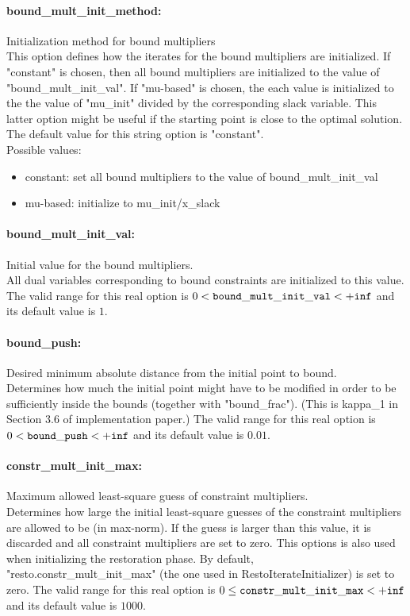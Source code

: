 \paragraph{bound\_mult\_init\_method:}\label{sec:bound_mult_init_method} Initialization method for bound multipliers $\;$ \\
 This option defines how the iterates for the
bound multipliers are initialized.  If "constant"
is chosen, then all bound multipliers are
initialized to the value of
"bound\_mult\_init\_val".  If "mu-based" is
chosen, the each value is initialized to the the
value of "mu\_init" divided by the corresponding
slack variable.  This latter option might be
useful if the starting point is close to the
optimal solution.
The default value for this string option is "constant".
\\ 
Possible values:
\begin{itemize}
   \item constant: set all bound multipliers to the value of
bound\_mult\_init\_val
   \item mu-based: initialize to mu\_init/x\_slack
\end{itemize}

\paragraph{bound\_mult\_init\_val:}\label{sec:bound_mult_init_val} Initial value for the bound multipliers. $\;$ \\
 All dual variables corresponding to bound
constraints are initialized to this value. The valid range for this real option is 
$0 <  {\tt bound\_mult\_init\_val } <  {\tt +inf}$
and its default value is $1$.


\paragraph{bound\_push:}\label{sec:bound_push} Desired minimum absolute distance from the initial point to bound. $\;$ \\
 Determines how much the initial point might have
to be modified in order to be sufficiently inside
the bounds (together with "bound\_frac").  (This
is kappa\_1 in Section 3.6 of implementation
paper.) The valid range for this real option is 
$0 <  {\tt bound\_push } <  {\tt +inf}$
and its default value is $0.01$.


\paragraph{constr\_mult\_init\_max:}\label{sec:constr_mult_init_max} Maximum allowed least-square guess of constraint multipliers. $\;$ \\
 Determines how large the initial least-square
guesses of the constraint multipliers are allowed
to be (in max-norm). If the guess is larger than
this value, it is discarded and all constraint
multipliers are set to zero.  This options is
also used when initializing the restoration
phase. By default,
"resto.constr\_mult\_init\_max" (the one used in
RestoIterateInitializer) is set to zero. The valid range for this real option is 
$0 \le {\tt constr\_mult\_init\_max } <  {\tt +inf}$
and its default value is $1000$.



